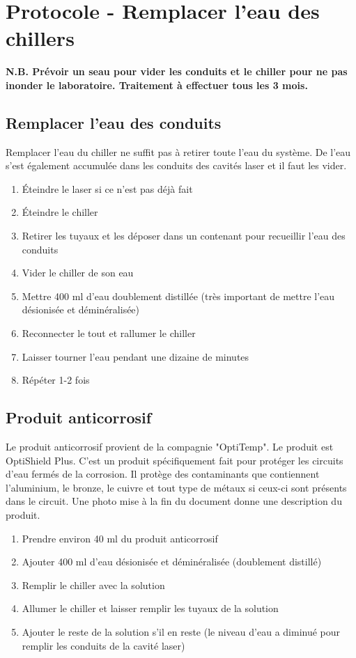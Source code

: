 \newpage
\section{Protocole - Remplacer l'eau des chillers}
\label{a:chillers}

\textbf{N.B. Prévoir un seau pour vider les conduits et le chiller pour ne pas inonder le laboratoire. Traitement à effectuer tous les 3 mois.}

\subsection*{Remplacer l'eau des conduits}
Remplacer l'eau du chiller ne suffit pas à retirer toute l'eau du système. De l'eau s'est également accumulée dans les conduits des cavités laser et il faut les vider.
\begin{enumerate}
\item Éteindre le laser si ce n'est pas déjà fait
\item Éteindre le chiller
\item Retirer les tuyaux et les déposer dans un contenant pour recueillir l'eau des conduits
\item Vider le chiller de son eau
\item Mettre 400 ml d'eau doublement distillée (très important de mettre l'eau désionisée et déminéralisée)
\item Reconnecter le tout et rallumer le chiller
\item Laisser tourner l'eau pendant une dizaine de minutes
\item Répéter 1-2 fois
\end{enumerate}

\subsection*{Produit anticorrosif}
Le produit anticorrosif provient de la compagnie "OptiTemp". Le produit est OptiShield Plus. C'est un produit spécifiquement fait pour protéger les circuits d'eau fermés de la corrosion. Il protège des contaminants que contiennent l'aluminium, le bronze, le cuivre et tout type de métaux si ceux-ci sont présents dans le circuit. Une photo mise à la fin du document donne une description du produit.
\begin{enumerate}
\item Prendre environ 40 ml du produit anticorrosif
\item Ajouter 400 ml d'eau désionisée et déminéralisée (doublement distillé)
\item Remplir le chiller avec la solution
\item Allumer le chiller et laisser remplir les tuyaux de la solution
\item Ajouter le reste de la solution s'il en reste (le niveau d'eau a diminué pour remplir les conduits de la cavité laser)
\end{enumerate}

